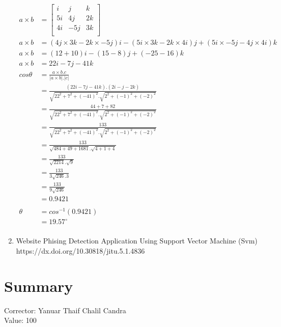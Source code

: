 \documentclass[12pt,titlepage]{article}
\begin{document}
\begin{enumerate}
{\begin{enumerate}
{                \begin{align*}
                    a \times b &= \left[\begin{matrix}
                        i  &  j &  k \\
                        5i & 4j & 2k \\
                        4i & -5j & 3k \\
                    \end{matrix}\right]\\
                    a \times b &= (4j \times 3k - 2k \times -5j)i - (5i \times 3k - 2k \times 4i)j + (5i \times -5j - 4j \times 4i)k \\
                    a \times b &= (12 + 10)i - (15 - 8)j + (-25 - 16)k\\
                    a \times b &= 22i - 7j - 41k\\
                    cos\theta &= \frac{a \times b . c}{|a \times b| . |c|}\\
                    &= \frac{(22i - 7j - 41k).(2i - j - 2k)}{\sqrt{22^2 + 7^2 + (-41)^2}.\sqrt{2^2 + (-1)^2 + (-2)^2}}\\
                    &= \frac{44 + 7 + 82}{\sqrt{22^2 + 7^2 + (-41)^2}.\sqrt{2^2 + (-1)^2 + (-2)^2}}\\
                    &= \frac{133}{\sqrt{22^2 + 7^2 + (-41)^2}.\sqrt{2^2 + (-1)^2 + (-2)^2}}\\
                    &= \frac{133}{\sqrt{484 + 49 + 1681}.\sqrt{4 + 1 + 4}}\\
                    &= \frac{133}{\sqrt{2214}.\sqrt{9}}\\
                    &= \frac{133}{3\sqrt{246}.3}\\
                    &= \frac{133}{9\sqrt{246}}\\
                    &= 0.9421\\
                    \\
                    \theta &= cos^{-1}(0.9421)\\
                    &= 19.57^{\circ}\\
                \end{align*}
            }
        \end{enumerate}
    }
    \item {
        Website Phising Detection Application Using Support Vector Machine (Svm)\\
        https://dx.doi.org/10.30818/jitu.5.1.4836
    }
\end{enumerate}

\pagebreak

\section{Summary}
Corrector: Yanuar Thaif Chalil Candra\\
Value: 100
\end{document}
